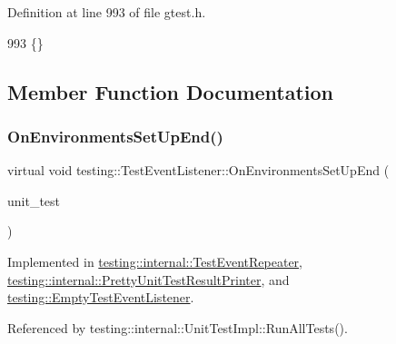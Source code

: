 Definition at line 993 of file gtest.\+h.


\begin{DoxyCode}
993 \{\}
\end{DoxyCode}


\subsection{Member Function Documentation}
\mbox{\label{classtesting_1_1TestEventListener_aaa1021d75f5dbf3f05c829c1cc520341}} 
\subsubsection{\texorpdfstring{On\+Environments\+Set\+Up\+End()}{OnEnvironmentsSetUpEnd()}}
{\footnotesize\ttfamily virtual void testing\+::\+Test\+Event\+Listener\+::\+On\+Environments\+Set\+Up\+End (\begin{DoxyParamCaption}\item[{const \hyperlink{classtesting_1_1UnitTest}{Unit\+Test} \&}]{unit\+\_\+test }\end{DoxyParamCaption})\hspace{0.3cm}{\ttfamily [pure virtual]}}



Implemented in \hyperlink{classtesting_1_1internal_1_1TestEventRepeater_a3a92696df942dc92f985e52fddd6d303}{testing\+::internal\+::\+Test\+Event\+Repeater}, \hyperlink{classtesting_1_1internal_1_1PrettyUnitTestResultPrinter_aadba892f02606a8b0c5f5982b3553aac}{testing\+::internal\+::\+Pretty\+Unit\+Test\+Result\+Printer}, and \hyperlink{classtesting_1_1EmptyTestEventListener_abc481c6648d15d4242245195a06f5aa0}{testing\+::\+Empty\+Test\+Event\+Listener}.



Referenced by testing\+::internal\+::\+Unit\+Test\+Impl\+::\+Run\+All\+Tests().

